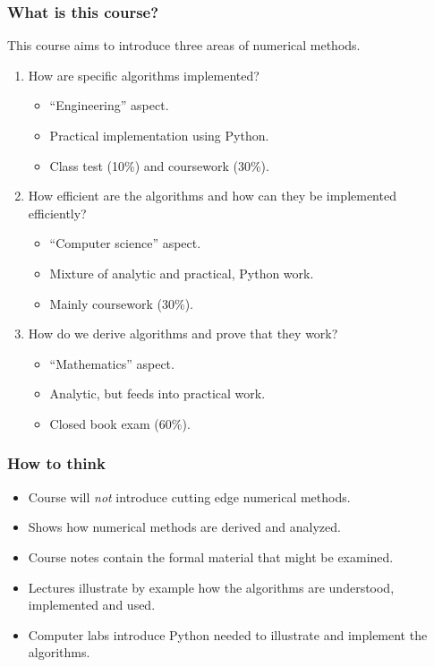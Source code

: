 \documentclass{beamer}
\begin{document}
\begin{frame}
  \frametitle{What is this course?}

  This course aims to introduce three areas of numerical methods.\pause

  \begin{enumerate}
  \item<2-> How are specific algorithms implemented?
    \begin{itemize}
    \item ``Engineering'' aspect.
    \item Practical implementation using Python.
    \item Class test (10\%) and coursework (30\%).
    \end{itemize}
  \item<3-> How efficient are the algorithms and how can they be
    implemented efficiently?
    \begin{itemize}
    \item ``Computer science'' aspect.
    \item Mixture of analytic and practical, Python work.
    \item Mainly coursework (30\%).
    \end{itemize}
  \item<4> How do we derive algorithms and prove that they work?
    \begin{itemize}
    \item ``Mathematics'' aspect.
    \item Analytic, but feeds into practical work.
    \item Closed book exam (60\%).
    \end{itemize}
  \end{enumerate}

\end{frame}


\begin{frame}
  \frametitle{How to think}

  \begin{itemize}
  \item Course will \emph{not} introduce cutting edge
    numerical methods.
  \item Shows how numerical methods are derived and
    analyzed. \pause
  \item Course notes contain the formal material that
    might be examined.
  \item Lectures illustrate by example how the algorithms are understood,
    implemented and used. \pause
  \item Computer labs  introduce Python needed to
    illustrate and implement the algorithms.
  \end{itemize}

\end{frame}
\end{document}
